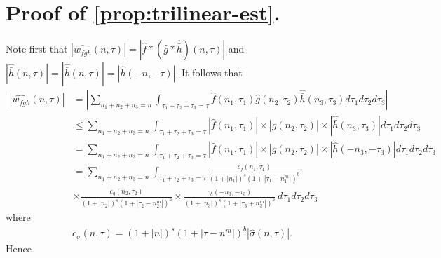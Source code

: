 \documentclass[12pt,reqno]{amsart}
\numberwithin{equation}{section}  %
\numberwithin{figure}{section}
\newcommand{\wh}{\widehat}
\theoremstyle{plain}
\theoremstyle{definition}
\theoremstyle{remark}
\begin{document}
\section{Proof of \autoref{prop:trilinear-est}.}
%
%
%
%
%
%
Note first that $|\wh{w_{fgh}}(n, \tau) |  = | \wh{f} * ( \wh{g} 
* \wh{\bar h})(n, \tau)|$ and $| \wh{\bar{h}}(n, \tau) | = |\overline{ \wh{\overline{h}} 
}(n, \tau)| = | \wh{h}(-n, -\tau) |$. It follows that
%
%
\begin{equation}
	\label{non-lin-rep}
	\begin{split}
		| \wh{w_{fgh}}(n, \tau)|
    & = |  \sum_{n_1+ n_2+ n_3= n}  \int_{\tau_{1} + \tau_{2} + \tau_{3} = \tau} \wh{f}\left( n_1,  \tau_1 
\right) \wh{g}\left( n_2, \tau_2  
\right) \wh{\bar h}\left( n_3, \tau_3 \right) d \tau_1 d \tau_2 d \tau_3 |
\\
& \le \sum_{n_1+ n_2+ n_3= n}  \int_{\tau_{1} + \tau_{2} + \tau_{3} = \tau} | \wh{f}\left( n_1, \tau_1 
\right) | \times  | \wh{g}\left( n_2, \tau_2 
\right) | \times | \wh{\bar h}\left( n_3, \tau_3 \right) | d \tau_1 d \tau_2 d 
\tau_3
\\
& = \sum_{n_1+ n_2+ n_3= n}  \int_{\tau_{1} + \tau_{2} + \tau_{3} = \tau} | \wh{f}\left( n_1, \tau_1 
\right) | \times | \wh{g}\left( n_2, \tau_2 
\right) | \times | \wh{h}\left( -n_3, - \tau_3 \right) | d \tau_1 d \tau_2 d 
\tau_3
\\
& = \sum_{n_1+ n_2+ n_3= n}  \int_{\tau_{1} + \tau_{2} + \tau_{3} = \tau}\frac{c_f\left( n_1, \tau_1 
\right)}{\left (1 + |n_1| \right )^s \left( 1 + | \tau_1 - n_1^{m} | \right)^{b}}
\\
& \times \frac{c_{g}\left( n_2, \tau_2 \right)}{\left (1 + |n_2| \right ) 
^s\left( 1 + | \tau_2 -  n_2^{m }| 
\right)^{b}}
 \times \frac{c_{h}\left( -n_3, -\tau_3 \right)}{\left (1 + |n_3| \right ) ^s\left( 1 + | 
\tau_3 + n_3^{m } | \right)^{b}} \ d \tau_1 d \tau_2 d \tau_3
\end{split}
\end{equation}
%
%
where
%
%
\begin{equation*}
	\begin{split}
		c_\sigma(n, \tau) = \left (1 + |n| \right ) ^s \left( 1 + | \tau - n^{m } |  
		\right)^{b} | \wh{\sigma}\left( n, \tau \right) | .
	\end{split}
\end{equation*}
%
%
Hence
%
%
\end{document}
